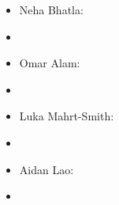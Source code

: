 \documentclass[]{article}
\begin{document}
\begin{itemize}
	\item Neha Bhatla:
	\item \begin{itemize} \end{itemize}
	\item Omar Alam:
	\item \begin{itemize} \end{itemize}
	\item Luka Mahrt-Smith:
	\item \begin{itemize} \end{itemize}
	\item Aidan Lao:
	\item \begin{itemize} \end{itemize}
	
	
	
\end{itemize}
\end{document}

